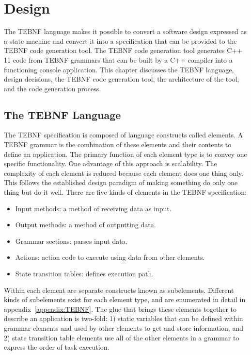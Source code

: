 \chapter{Design}
The TEBNF language makes it possible to convert a software design expressed as a state machine and convert it into a specification that can be provided to the TEBNF code generation tool.  The TEBNF code generation tool generates C++ 11 code from TEBNF grammars that can be built by a C++ compiler into a functioning console application.  This chapter discusses the TEBNF language, design decisions, the TEBNF code generation tool, the architecture of the tool, and the code generation process.

\section{The TEBNF Language}
The TEBNF specification is composed of language constructs called elements.  A TEBNF grammar is the combination of these elements and their contents to define an application.   The primary function of each element type is to convey one specific functionality.  One advantage of this approach is scalability.  The complexity of each element is reduced because each element does one thing only.  This follows the established design paradigm of making something do only one thing but do it well.  There are five kinds of elements in the TEBNF specification:
\begin{itemize}
  \item Input methods: a method of receiving data as input.
  \item Output methods: a method of outputting data.
  \item Grammar sections: parses input data. 
  \item Actions: action code to execute using data from other elements.
  \item State transition tables: defines execution path.
\end{itemize}

\indent
Within each element are separate constructs known as subelements.  Different kinds of subelements exist for each element type, and are enumerated in detail in appendix~\ref{appendix:TEBNF}.  The glue that brings these elements together to describe an application is two-fold: 1) static variables that can be defined within grammar elements and used by other elements to get and store information, and 2) state transition table elements use all of the other elements in a grammar to express the order of task execution.

